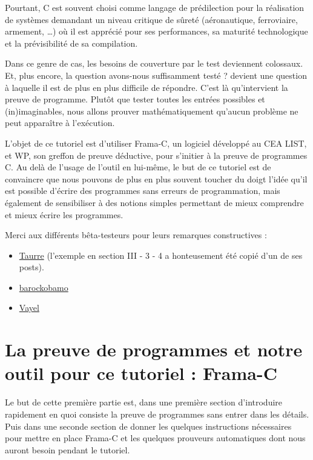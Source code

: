 \documentclass[12pt,francais,]{scrbook}
\newenvironment{zdsblock}[1]{%
  \tcolorbox[beamer,%
    noparskip,breakable,
    colback=LightBlue,colframe=DarkBlue,%
    colbacklower=DarkBlue,%
    title=#1]
}{\endtcolorbox}
\begin{document}
Pourtant, C est souvent choisi comme langage de prédilection pour la
réalisation de systèmes demandant un niveau critique de sûreté
(aéronautique, ferroviaire, armement, \ldots{}) où il est apprécié pour
ses performances, sa maturité technologique et la prévisibilité de sa
compilation.

Dans ce genre de cas, les besoins de couverture par le test deviennent
colossaux. Et, plus encore, la question \og{}avons-nous suffisamment testé
?\fg{} devient une question à laquelle il est de plus en plus difficile de
répondre. C'est là qu'intervient la preuve de programme. Plutôt que
tester toutes les entrées possibles et (in)imaginables, nous allons
prouver \og{}mathématiquement\fg{} qu'aucun problème ne peut apparaître à
l'exécution.

L'objet de ce tutoriel est d'utiliser Frama-C, un logiciel développé au
CEA LIST, et WP, son greffon de preuve déductive, pour s'initier à la
preuve de programmes C. Au delà de l'usage de l'outil en lui-même, le
but de ce tutoriel est de convaincre que nous pouvons de plus en plus
souvent toucher du doigt l'idée qu'il est possible d'écrire des
programmes sans erreurs de programmation, mais également de sensibiliser
à des notions simples permettant de mieux comprendre et mieux écrire les
programmes.

\begin{zdsblock}{Information}
  Merci aux différents bêta-testeurs
  pour leurs remarques constructives :
  \begin{itemize}
  \item \href{https://zestedesavoir.com/membres/voir/Taurre/}{Taurre} (l'exemple
    en section III - 3 - 4 a honteusement été copié d'un de ses
    posts).
  \item \href{https://zestedesavoir.com/membres/voir/barockobamo/}{barockobamo}
  \item \href{https://zestedesavoir.com/membres/voir/Vayel/}{Vayel}
  \end{itemize}
\end{zdsblock}

\chapter{La preuve de programmes et notre outil pour ce tutoriel :
Frama-C}\label{la-preuve-de-programmes-et-notre-outil-pour-ce-tutoriel-frama-c}

Le but de cette première partie est, dans une première section
d'introduire rapidement en quoi consiste la preuve de programmes sans
entrer dans les détails. Puis dans une seconde section de donner les
quelques instructions nécessaires pour mettre en place Frama-C et les
quelques prouveurs automatiques dont nous auront besoin pendant le
tutoriel.
\end{document}
